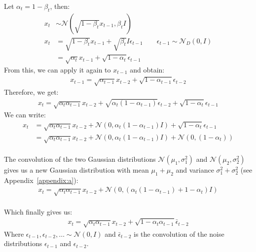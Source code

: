 \documentclass[twoside]{article}
\numberwithin{equation}{section}
\numberwithin{figure}{section}
\begin{document}
Let $\alpha_t = 1 - \beta_t$, then:
\begin{align*}
  x_t &\sim \mathcal{N}\left(\sqrt{1 - \beta_t} x_{t-1}, \beta_t I\right) \\
  x_t &= \sqrt{1 - \beta_t} x_{t-1} + \sqrt{\beta_t }I \epsilon_{t-1} \qquad \epsilon_{t - 1} \sim \mathcal{N}_D \left(0, I\right) \\
  &= \sqrt{\alpha_t} x_{t-1} + \sqrt{1 - \alpha_t} \epsilon_{t - 1}
\end{align*}
From this, we can apply it again to $x_{t-1}$ and obtain:
\begin{align*}
  x_{t-1} = \sqrt{\alpha_{t-1}} x_{t-2} + \sqrt{1 - \alpha_{t-1}} \epsilon_{t - 2}
\end{align*}
Therefore, we get:
\begin{align*}
  x_t = \sqrt{\alpha_t \alpha_{t-1}} x_{t-2} + \sqrt{\alpha_t\left(1 - \alpha_{t-1}\right)} \epsilon_{t - 2} + \sqrt{1 - \alpha_t} \epsilon_{t - 1}
\end{align*}
We can write:
\begin{align}
  x_t &= \sqrt{\alpha_t \alpha_{t-1}} x_{t-2} + \mathcal{N}\left(0, \alpha_t\left(1 - \alpha_{t-1}\right)I \right) + \sqrt{1 - \alpha_t} \epsilon_{t - 1} \\
&= \sqrt{\alpha_t \alpha_{t-1}} x_{t-2} + \mathcal{N}\left(0, \alpha_t\left(1 - \alpha_{t-1}\right)I\right) + \mathcal{N}\left(0, (1 - \alpha_t) \right) \label{eq:convolution}
\end{align}
\\
The convolution of the two Gaussian distributions $\mathcal{N}(\mu_1, \sigma_1^2)$ and $\mathcal{N}(\mu_2, \sigma_2^2)$ gives us a new Gaussian distribution with mean $\mu_1 + \mu_2$ and variance $\sigma_1^2 + \sigma_2^2$ (see Appendix~\ref{appendix:a}):
\begin{align}
  x_t = \sqrt{\alpha_t \alpha_{t-1}} x_{t-2} + \mathcal{N}\left(0, \left(\alpha_t\left(1 - \alpha_{t-1}\right) + 1 - \alpha_t\right)I\right)
\end{align}
\\
Which finally gives us:
\begin{align*}
  x_t = \sqrt{\alpha_t \alpha_{t-1}} x_{t-2} + \sqrt{1 - \alpha_t \alpha_{t-1}} \bar{\epsilon}_{t - 2}
\end{align*}
Where $\epsilon_{t - 1}, \epsilon_{t - 2}, \ldots \sim \mathcal{N}\left(0, I\right)$ and $\bar{\epsilon}_{t - 2}$ is the convolution of the noise distributions $\epsilon_{t - 1}$ and $\epsilon_{t - 2}$.
\end{document}
